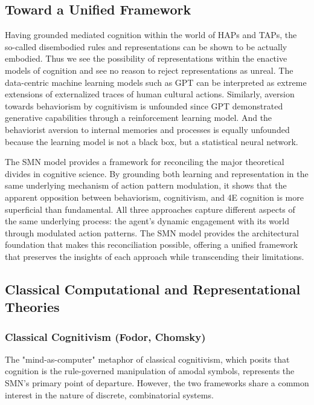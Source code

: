 \subsection{Toward a Unified Framework}
Having grounded mediated cognition within the world of HAPs and TAPs, the so-called disembodied rules and representations can be shown to be actually embodied. Thus we see the possibility of representations within the enactive models of cognition and see no reason to reject representations as unreal. The data-centric machine learning models such as GPT can be interpreted as extreme extensions of externalized traces of human cultural actions. Similarly, aversion towards behaviorism by cognitivism is unfounded since GPT demonstrated generative capabilities through a reinforcement learning model. And the behaviorist aversion to internal memories and processes is equally unfounded because the learning model is not a black box, but a statistical neural network. 

The SMN model provides a framework for reconciling the major theoretical divides in cognitive science. By grounding both learning and representation in the same underlying mechanism of action pattern modulation, it shows that the apparent opposition between behaviorism, cognitivism, and 4E cognition is more superficial than fundamental. All three approaches capture different aspects of the same underlying process: the agent's dynamic engagement with its world through modulated action patterns. The SMN model provides the architectural foundation that makes this reconciliation possible, offering a unified framework that preserves the insights of each approach while transcending their limitations.

\subsection{Classical Computational and Representational Theories}
\label{subsec:comparison_classical}

\subsubsection{Classical Cognitivism (Fodor, Chomsky)}
\label{ssubsec:cognitivism}
The "mind-as-computer" metaphor of classical cognitivism, which posits that cognition is the rule-governed manipulation of amodal symbols, represents the SMN's primary point of departure. However, the two frameworks share a common interest in the nature of discrete, combinatorial systems.

